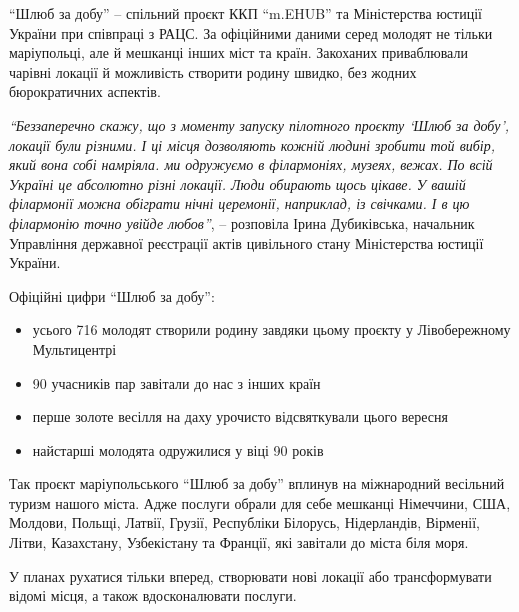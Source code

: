 
\enquote{Шлюб за добу} – спільний проєкт ККП \enquote{m.EHUB} та Міністерства юстиції України
при співпраці з РАЦС. За офіційними даними серед молодят не тільки маріупольці,
але й мешканці інших міст та країн. Закоханих приваблювали чарівні локації й
можливість створити родину швидко, без жодних бюрократичних аспектів.


\emph{\enquote{Беззаперечно скажу, що з моменту запуску пілотного проєкту \enquote{Шлюб за добу},
локації були різними. І ці місця дозволяють кожній людині зробити той вибір,
який вона собі намріяла. ми одружуємо в філармоніях, музеях, вежах. По всій
Україні це абсолютно різні локації. Люди обирають щось цікаве. У вашій
філармонії можна обіграти нічні церемонії, наприклад, із свічками. І в цю
філармонію точно увійде любов}}, – розповіла Ірина Дубиківська, начальник
Управління державної реєстрації актів цивільного стану Міністерства юстиції
України.



Офіційні цифри \enquote{Шлюб за добу}: 

\begin{itemize}
  \item усього 716 молодят створили родину завдяки цьому проєкту у Лівобережному Мультицентрі
  \item 90 учасників пар завітали до нас з інших країн
  \item перше золоте весілля на даху урочисто відсвяткували цього вересня
  \item найстарші молодята одружилися у віці 90 років
\end{itemize}


Так проєкт маріупольського \enquote{Шлюб за добу} вплинув на міжнародний
весільний туризм нашого міста. Адже послуги обрали для себе мешканці Німеччини,
США, Молдови, Польщі, Латвії, Грузії, Республіки Білорусь, Нідерландів,
Вірменії, Літви, Казахстану, Узбекістану та Франції, які завітали до міста біля
моря.


У планах рухатися тільки вперед, створювати нові локації або трансформувати
відомі місця, а також вдосконалювати послуги.

